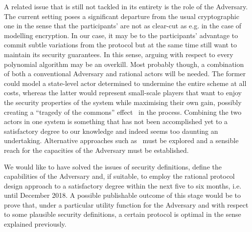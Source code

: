   A related issue that is still not tackled in its entirety is the role of the Adversary.
  The current setting poses a significant departure from the usual cryptographic one in
  the sense that the participants' are not as clear-cut as e.g. in the case of modelling
  encryption. In our case, it may be to the participants' advantage to commit subtle
  variations from the protocol but at the same time still want to maintain its security
  guarantees. In this sense, arguing with respect to every polynomial algorithm may be an
  overkill. Most probably though, a combination of both a conventional Adversary and
  rational actors will be needed. The former could model a state-level actor determined to
  undermine the entire scheme at all costs, whereas the latter would represent small-scale
  players that want to enjoy the security properties of the system while maximising their
  own gain, possibly creating a ``tragedy of the commons'' effect~\cite{tragedy} in the
  process. Combining the two actors in one system is something that has not been
  accomplished yet to a satisfactory degree to our knowledge and indeed seems too daunting
  an undertaking.  Alternative approaches such as~\cite{rationalprotocol} must be explored
  and a sensible reach for the capacities of the Adversary must be established.

  We would like to have solved the issues of security definitions, define the capabilities
  of the Adversary and, if suitable, to employ the rational protocol design approach to a
  satisfactory degree within the next five to six months, i.e. until December 2018. A
  possible publishable outcome of this stage would be to prove that, under a particular
  utility function for the Adversary and with respect to some plausible security
  definitions, a certain protocol is optimal in the sense explained previously.
